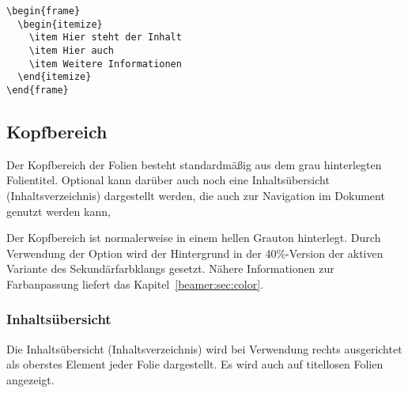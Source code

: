 \begin{minipage}{0.5\textwidth}
\begin{verbatim}
\begin{frame}
  \begin{itemize}
    \item Hier steht der Inhalt
    \item Hier auch
    \item Weitere Informationen
  \end{itemize}
\end{frame}
\end{verbatim}
\end{minipage}
\begin{minipage}{0.5\textwidth}
\end{minipage}

\subsection{Kopfbereich}\label{subsec:head}

Der Kopfbereich der Folien besteht standardmäßig aus dem grau hinterlegten
Folientitel. Optional kann darüber auch noch eine Inhaltsübersicht
(Inhaltsverzeichnis) dargestellt werden,
die auch zur Navigation im Dokument genutzt werden kann,

\begin{Declaration}
\end{Declaration}

Der Kopfbereich ist normalerweise in einem hellen Grauton hinterlegt.
Durch Verwendung der Option  wird der Hintergrund
in der 40\%-Version der aktiven Variante des Sekundärfarbklangs gesetzt.
Nähere Informationen zur Farbanpassung liefert das
Kapitel~\ref{beamer:sec:color}.

\subsubsection{Inhaltsübersicht}

Die Inhaltsübersicht (Inhaltsverzeichnis) wird bei Verwendung rechts
ausgerichtet als oberstes Element jeder Folie dargestellt.
Es wird auch auf titellosen Folien angezeigt.


\begin{Declaration}
  \\
\end{Declaration}

